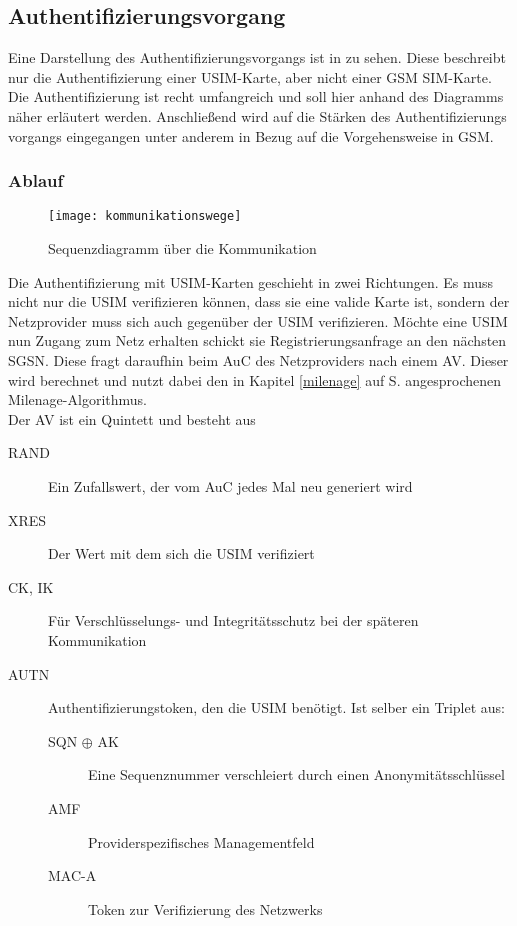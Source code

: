 \subsection{Authentifizierungsvorgang}
\label{authentifizierungsvorgang}

Eine Darstellung des Authentifizierungsvorgangs ist in  zu
sehen. Diese beschreibt nur die Authentifizierung einer \ac{USIM}-Karte, aber nicht einer
GSM \ac{SIM}-Karte. \\
Die Authentifizierung ist recht umfangreich und soll hier anhand des Diagramms näher
erläutert werden. Anschließend wird auf die Stärken des Authentifizierungs\-
vorgangs eingegangen unter anderem in Bezug auf die Vorgehensweise in GSM.

 \subsubsection{Ablauf}
 
 \begin{figure}[htp]
 \begin{center}
  \texttt{[image: kommunikationswege]}
 \end{center}
 \caption[Sequenzdiagramm über die Kommunikation zwischen SIM-Karte und Authentication Center]{Sequenzdiagramm über die Kommunikation}
 \label{fig:kommunikationswege}
\end{figure}

 Die Authentifizierung mit \ac{USIM}-Karten geschieht in zwei Richtungen. Es muss nicht nur die
 USIM verifizieren können, dass sie eine valide Karte ist, sondern der Netzprovider muss sich auch
 gegenüber der USIM verifizieren. Möchte eine USIM nun Zugang zum Netz erhalten schickt sie
 Registrierungsanfrage an den nächsten \ac{SGSN}. Diese fragt daraufhin beim \ac{AuC} des
 Netzproviders nach einem \ac{AV}. Dieser wird berechnet und nutzt dabei den in Kapitel
 \ref{milenage} auf S. \pageref{milenage} angesprochenen Milenage-Algorithmus. \\
 Der AV ist ein Quintett und besteht aus
 
 \begin{description}
  \item [RAND] Ein Zufallswert, der vom AuC jedes Mal neu generiert wird
  \item [XRES] Der Wert mit dem sich die USIM verifiziert
  \item [CK, IK] Für Verschlüsselungs- und Integritätsschutz bei der späteren Kommunikation
  \item [AUTN] Authentifizierungstoken, den die USIM benötigt. Ist selber ein Triplet aus:
  \begin{description}
   \item [SQN $\oplus$ AK] Eine Sequenznummer verschleiert durch einen Anonymitätsschlüssel
   \item [AMF] Providerspezifisches Managementfeld
   \item [MAC-A] Token zur Verifizierung des Netzwerks
  \end{description}
 \end{description}
 
